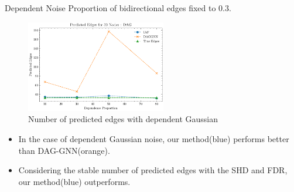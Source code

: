 \documentclass{beamer}
\begin{document}
\begin{frame}[allowframebreaks]{Dependent Noise}
    Proportion of bidirectional edges fixed to 0.3.
    \begin{figure}
        \centering
        \includegraphics[height=4cm]{fig/Predicted Edges_dependence_30_DAG_threshold0.3.pdf}
        \caption{Number of predicted edges with dependent Gaussian}
        \label{fig:dep_gaussian_edges}
    \end{figure}
    \begin{itemize}
        \item In the case of dependent Gaussian noise, our method(blue) performs better than DAG-GNN(orange).
        \item Considering the stable number of predicted edges with the SHD and FDR, our method(blue) outperforms.
    \end{itemize}


\end{frame}
\end{document}
